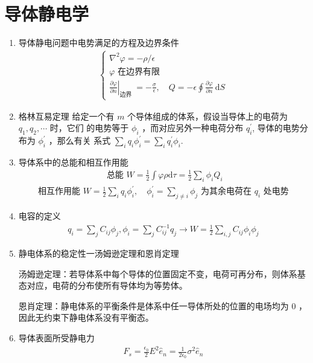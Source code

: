 \documentclass[../../note.tex]{subfiles}
\begin{document}
\section{导体静电学}
\begin{enumerate}
	\item 导体静电问题中电势满足的方程及边界条件
	\begin{align}\left\{
		\begin{array}{l}
				\nabla^2 \varphi=-\rho / \epsilon \\
			\varphi \text { 在边界有限 } \\
			\left.\frac{\partial \varphi}{\partial n}\right|_{\text {边界 }}=-\frac{\sigma}{\epsilon}, \quad Q=-\epsilon \oint \frac{\partial \varphi}{\partial n} \mathrm{~d} S
		\end{array}
	\right.
\end{align}
	\item 格林互易定理
	给定一个有 $m$ 个导体组成的体系，假设当导体上的电荷为 $q_1, q_2, \cdots$ 时，它们 的电势等于 $\phi_i$ ，而对应另外一种电荷分布 $q_i^{\prime}$, 导体的电势分布为 $\phi_i^{\prime}$ ，那么有关 系式 $\sum_i q_i \phi_i^{\prime}=\sum_i q_i^{\prime} \phi_i$.
	\item 导体系中的总能和相互作用能
	\begin{align}
\text { 总能 } W=\frac{1}{2} \int \varphi \rho \mathrm{d} \tau=\frac{1}{2} \sum_i \phi_i Q_i
	\end{align}
	\begin{align}
\text { 相互作用能 } W=\frac{1}{2} \sum_i q_i \phi_i^{\prime}, \quad \phi_i^{\prime}=\sum_{j \neq i} \phi_j \text { 为其余电荷在 } q_i \text { 处电势 }
\end{align}
	\item 电容的定义
	\begin{align}
	q_i=\sum_j C_{i j} \phi_j, \phi_i=\sum_j C_{i j}^{-1} q_j \rightarrow W=\frac{1}{2} \sum_{i, j} C_{i j} \phi_i \phi_j
\end{align}
	\item 静电体系的稳定性一汤姆逊定理和恩肖定理
	
	汤姆逊定理：若导体系中每个导体的位置固定不变，电荷可再分布，则体系基 态对应，电荷的分布使所有导体均为等势体。
	
	恩肖定理：静电体系的平衡条件是体系中任一导体所处的位置的电场均为 0 ， 因此无约束下静电体系没有平衡态。
	
	\item 导体表面所受静电力
	\begin{align}
	F_s=\frac{\epsilon_0}{2} E^2 \hat{e}_n=\frac{1}{2 \epsilon_0} \sigma^2 \hat{e}_n
	\end{align}
\end{enumerate}
\end{document}
